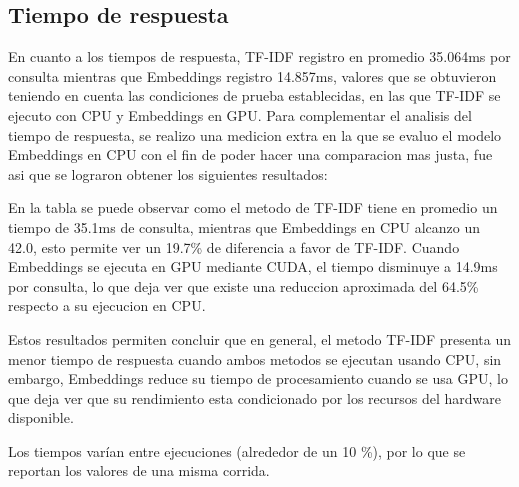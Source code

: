 \subsection{Tiempo de respuesta}

En cuanto a los tiempos de respuesta, TF-IDF registro en promedio 35.064ms por consulta mientras que Embeddings registro 14.857ms, valores que se obtuvieron teniendo en cuenta las condiciones de prueba establecidas, en las que TF-IDF se ejecuto con CPU y Embeddings en GPU. Para complementar el analisis del tiempo de respuesta, se realizo una medicion extra en la que se evaluo el modelo Embeddings en CPU con el fin de poder hacer una comparacion mas justa, fue asi que se lograron obtener los siguientes resultados:

\begin{table}[htbp]
    \centering
    \caption{Comparación de los tiempos de respuesta según el método y el hardware de ejecución.}
    \label{tab:tiempos_respuesta}
\end{table}

En la tabla se puede observar como el metodo de TF-IDF tiene en promedio un tiempo de 35.1ms de consulta, mientras que Embeddings en CPU alcanzo un 42.0, esto permite ver un 19.7\% de diferencia a favor de TF-IDF. Cuando Embeddings se ejecuta en GPU mediante CUDA, el tiempo disminuye a 14.9ms por consulta, lo que deja ver que existe una reduccion aproximada del 64.5\% respecto a su ejecucion en CPU.

Estos resultados permiten concluir que en general, el metodo TF-IDF presenta un menor tiempo de respuesta cuando ambos metodos se ejecutan usando CPU, sin embargo, Embeddings reduce su tiempo de procesamiento cuando se usa GPU, lo que deja ver que su rendimiento esta condicionado por los recursos del hardware disponible. 

Los tiempos varían entre ejecuciones (alrededor de un 10 \%), por lo que se reportan los valores de una misma corrida.

